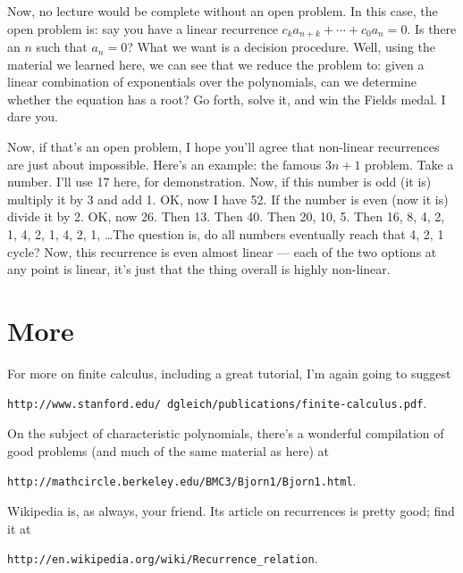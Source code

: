 \documentclass[12pt,letterpaper]{article}
\begin{document}
Now, no lecture would be complete without an open problem. In this case, the
open problem is: say you have a linear recurrence $c_k a_{n+k} + \cdots + c_0 a_n = 0$.
Is there an $n$ such that $a_n = 0$? What we want is a decision procedure. Well,
using the material we learned here, we can see that we reduce the problem to:
given a linear combination of exponentials over the polynomials, can we determine
whether the equation has a root? Go forth, solve it, and win the Fields medal.
I dare you.

Now, if that's an open problem, I hope you'll agree that non-linear recurrences
are just about impossible. Here's an example: the famous $3n+1$ problem. Take a
number. I'll use 17 here, for demonstration. Now, if this number is odd (it is)
multiply it by 3 and add 1. OK, now I have 52. If the number is even (now it is)
divide it by 2. OK, now 26. Then 13. Then 40. Then 20, 10, 5. Then 16, 8, 4, 2, 1,
4, 2, 1, 4, 2, 1, \dots The question is, do all numbers eventually reach that
4, 2, 1 cycle? Now, this recurrence is even almost linear --- each of the two
options at any point is linear, it's just that the thing overall is highly non-linear.

\section{More}
For more on finite calculus, including a great tutorial, I'm again going to suggest
\begin{center}\texttt{http://www.stanford.edu/\string~dgleich/publications/finite-calculus.pdf}.\end{center}

On the subject of characteristic polynomials, there's a wonderful
compilation of good problems (and much of the same material as here)
at
\begin{center}\texttt{http://mathcircle.berkeley.edu/BMC3/Bjorn1/Bjorn1.html}.\end{center}

Wikipedia is, as always, your friend. Its article on recurrences
is pretty good; find it at
\begin{center}\texttt{http://en.wikipedia.org/wiki/Recurrence\string_relation}.\end{center}
\end{document}
